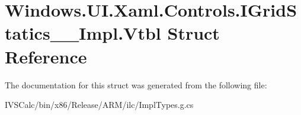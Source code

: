 \hypertarget{struct_windows_1_1_u_i_1_1_xaml_1_1_controls_1_1_i_grid_statics_____impl_1_1_vtbl}{}\section{Windows.\+U\+I.\+Xaml.\+Controls.\+I\+Grid\+Statics\+\_\+\+\_\+\+Impl.\+Vtbl Struct Reference}
\label{struct_windows_1_1_u_i_1_1_xaml_1_1_controls_1_1_i_grid_statics_____impl_1_1_vtbl}


The documentation for this struct was generated from the following file\+:\begin{DoxyCompactItemize}
\item 
I\+V\+S\+Calc/bin/x86/\+Release/\+A\+R\+M/ilc/Impl\+Types.\+g.\+cs\end{DoxyCompactItemize}
